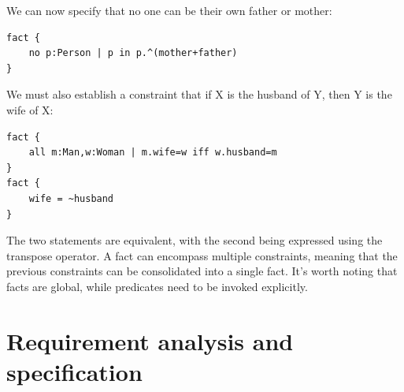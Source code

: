\documentclass[12pt, a4paper]{report}
\begin{document}
        We can now specify that no one can be their own father or mother:
        \begin{lstlisting}[language=alloy]
fact {
    no p:Person | p in p.^(mother+father)
}
        \end{lstlisting}
        We must also establish a constraint that if X is the husband of Y, then Y is the wife of X:
        \begin{lstlisting}[language=alloy]
fact {
    all m:Man,w:Woman | m.wife=w iff w.husband=m
}
fact {
    wife = ~husband
}
\end{lstlisting}
        The two statements are equivalent, with the second being expressed using the transpose operator.
        A fact can encompass multiple constraints, meaning that the previous constraints can be consolidated into a single fact.
        It's worth noting that facts are global, while predicates need to be invoked explicitly.

\newpage

\chapter{Requirement analysis and specification}
\end{document}
